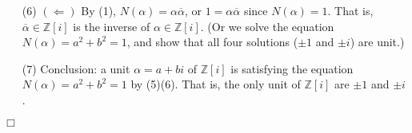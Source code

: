 \documentclass{article}
\begin{document}
\begin{enumerate}
\item[(6)]
  \emph{$(\Longleftarrow)$}
  By (1), $N(\alpha) = \alpha \overline{\alpha}$,
  or $1 = \alpha \overline{\alpha}$ since $N(\alpha) = 1$.
  That is, $\overline{\alpha} \in \mathbb{Z}[i]$ is
  the inverse of $\alpha \in \mathbb{Z}[i]$.
  (Or we solve the equation $N(\alpha) = a^2 + b^2 = 1$,
  and show that all four solutions ($\pm 1$ and $\pm i$) are unit.)

\item[(7)]
  Conclusion: a unit $\alpha = a+bi$ of $\mathbb{Z}[i]$
  is satisfying the equation $N(\alpha) = a^2 + b^2 = 1$ by (5)(6).
  That is, the only unit of $\mathbb{Z}[i]$ are $\pm 1$ and $\pm i$.
\end{enumerate}
$\Box$ \\\\



\end{document}
